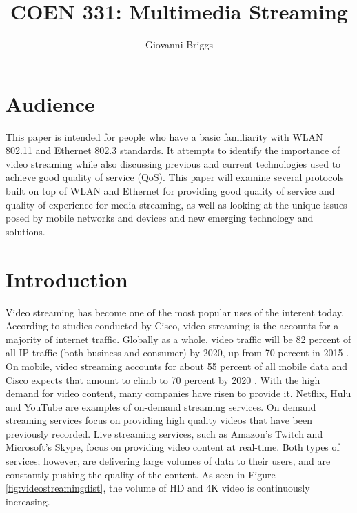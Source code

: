 \documentclass[12pt]{article}
\begin{document}
\title{COEN 331: Multimedia Streaming}
\author{Giovanni Briggs}

\maketitle

\clearpage

\tableofcontents
\clearpage

\listoffigures
\clearpage

\section{Audience}
This paper is intended for people who have a basic familiarity with WLAN 802.11 and Ethernet 802.3 standards.  It attempts to identify the importance of video streaming while also discussing previous and current technologies used to achieve good quality of service (QoS).  This paper will examine several protocols built on top of WLAN and Ethernet for providing good quality of service and quality of experience for media streaming, as well as looking at the unique issues posed by mobile networks and devices and new emerging technology and solutions.

\section{Introduction}
Video streaming has become one of the most popular uses of the interent today.  According to studies conducted by Cisco, video streaming is the accounts for a majority of internet traffic.  Globally as a whole, video traffic will be 82 percent of all IP traffic (both business and consumer) by 2020, up from 70 percent in 2015 \cite{ciscozetabyte}.  On mobile, video streaming accounts for about 55 percent of all mobile data and Cisco expects that amount to climb to 70 percent by 2020 \cite{cisconetworkindex}.  With the high demand for video content, many companies have risen to provide it.  Netflix, Hulu and YouTube are examples of on-demand streaming services.  On demand streaming services focus on providing high quality videos that have been previously recorded.  Live streaming services, such as Amazon's Twitch and Microsoft's Skype, focus on providing video content at real-time.  Both types of services; however, are delivering large volumes of data to their users, and are constantly pushing the quality of the content. As seen in Figure \ref{fig:videostreamingdist}, the volume of HD and 4K video is continuously increasing.
\end{document}

